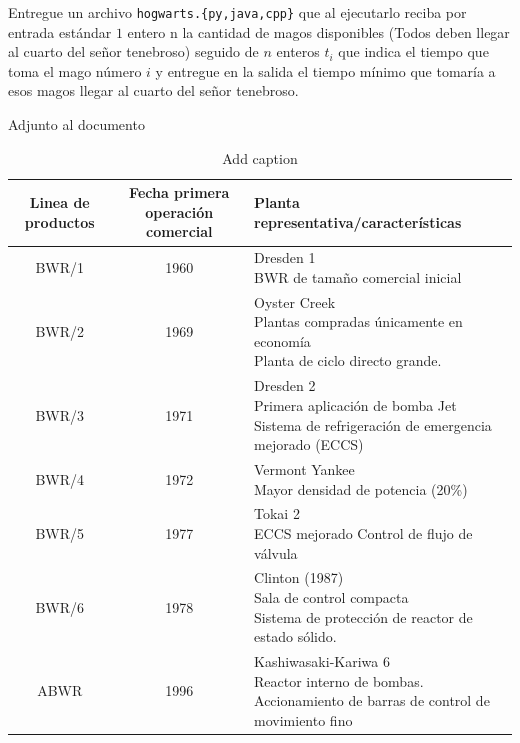 \documentclass[letterpaper,10pt,table, dvipsnames]{article}
\begin{document}
\begin{tcolorbox}
  Entregue un archivo \texttt{hogwarts.\{py,java,cpp\}} que al ejecutarlo reciba por entrada estándar $1$ entero n la cantidad de magos disponibles (Todos deben llegar al cuarto del señor tenebroso) seguido de $n$ enteros $t_i$ que indica el tiempo que toma el mago número $i$ y entregue en la salida el tiempo mínimo que tomaría a esos magos llegar al cuarto del señor tenebroso.
\end{tcolorbox}

Adjunto al documento

\begin{table}[htbp]
\centering
\caption{Add caption}
\begin{tabular}{|c|c|p{25em}|}
\hline
\multicolumn{1}{|p{5.355em}|}{\textbf{Linea de productos}} & \multicolumn{1}{p{12em}|}{\textbf{Fecha primera operación comercial}} & \textbf{Planta representativa/características} \\ \hline
BWR/1 & 1960 & \makecell{Dresden 1 \\ BWR de tamaño comercial inicial} \\\hline
BWR/2 & 1969 & \makecell{Oyster Creek \\ Plantas compradas únicamente en economía \\ Planta de ciclo directo grande.} \\ \hline
BWR/3 & 1971 & \makecell{Dresden 2 \\ Primera aplicación de bomba Jet \\ Sistema de refrigeración de emergencia mejorado (ECCS)} \\ \hline
BWR/4 & 1972 & \makecell{Vermont Yankee \\ Mayor densidad de potencia (20\%)} \\ \hline
BWR/5 & 1977 & \makecell{Tokai 2 \\ ECCS mejorado Control de flujo de válvula} \\ \hline
BWR/6 & 1978 & \makecell{Clinton (1987) \\ Sala de control compacta \\ Sistema de protección de reactor de estado sólido.} \\ \hline
ABWR & 1996 & \makecell{Kashiwasaki-Kariwa 6 \\ Reactor interno de bombas. \\ Accionamiento de barras de control de movimiento fino} \\ \hline
\end{tabular}
\label{tab:tabla1}
\end{table}
\end{document}
